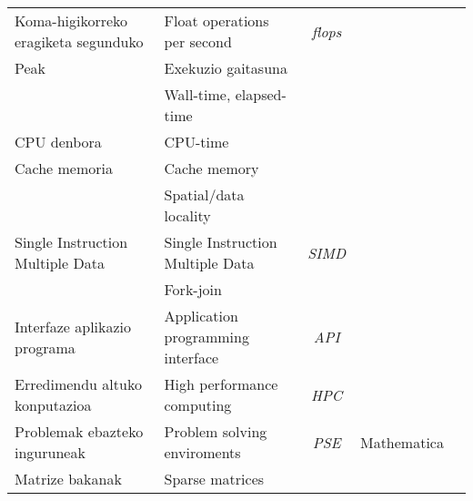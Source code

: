 \begin{table}
{\begin{tabular}{ l l c c c }
 Koma-higikorreko eragiketa segunduko    &  Float operations per second         &  \emph{flops}&                  \\   
 Peak                                    &  Exekuzio gaitasuna                   &             &                  \\
                                         &  Wall-time, elapsed-time              &             &                  \\
 CPU denbora                             &  CPU-time                             &             &                  \\
 Cache memoria                           &  Cache memory                         &             &                  \\ 
                                         &  Spatial/data locality                &             &                  \\
 Single Instruction Multiple Data        &  Single Instruction Multiple Data     & \emph{SIMD} &                  \\
                                         &  Fork-join                            &             &                  \\
 Interfaze aplikazio programa            &  Application programming interface    & \emph{API}  &                  \\
 Erredimendu altuko konputazioa          &  High performance computing           & \emph{HPC}  &                  \\
 Problemak ebazteko inguruneak           &  Problem solving enviroments          & \emph{PSE}  & Mathematica      \\
 Matrize bakanak                         &  Sparse matrices                      &             &                  \\
                                                            
 
                                
 \hline
 \end{tabular}}
\end{table}





